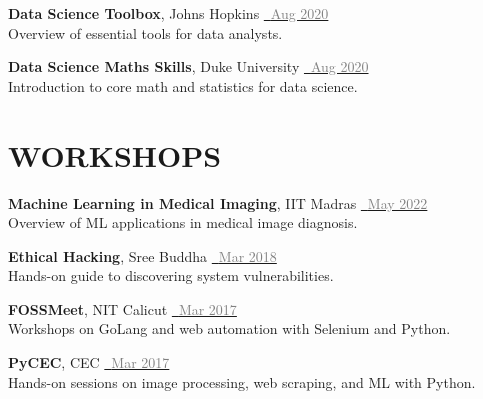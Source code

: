 \documentclass[11pt,a4paper]{article}
\begin{document}
\textbf{Data Science Toolbox}, Johns Hopkins \hfill
\href{https://coursera.org/share/bd0023b71386ae9c7246bad3d5b566a7}{\faFilePdfO~\textcolor{gray}{Aug 2020}}\\
Overview of essential tools for data analysts. 

\textbf{Data Science Maths Skills}, Duke University \hfill
\href{https://coursera.org/share/4bcf67532cd1ae69781e51db0bbb3445}{\faFilePdfO~\textcolor{gray}{Aug 2020}}\\
Introduction to core math and statistics for data science. 

\section*{WORKSHOPS}
\textbf{Machine Learning in Medical Imaging}, IIT Madras \hfill
\href{https://jishnujp.github.io/certificates/mlmedic.jpg}{\faFilePdfO~\textcolor{gray}{May 2022}} \\
Overview of ML applications in medical image diagnosis. 

\textbf{Ethical Hacking}, Sree Buddha \hfill
\href{https://jishnujp.github.io/certificates/ethical_hacking.jpg}{\faFilePdfO~\textcolor{gray}{Mar 2018}} \\
Hands-on guide to discovering system vulnerabilities. 

\textbf{FOSSMeet}, NIT Calicut \hfill
\href{https://jishnujp.github.io/certificates/fossmeet.jpg}{\faFilePdfO~\textcolor{gray}{Mar 2017}} \\
Workshops on GoLang and web automation with Selenium and Python. 

\textbf{PyCEC}, CEC \hfill
\href{https://jishnujp.github.io/certificates/pycec.jpg}{\faFilePdfO~\textcolor{gray}{Mar 2017}} \\
Hands-on sessions on image processing, web scraping, and ML with Python. 
\end{document}
